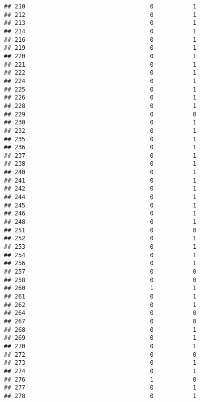 \documentclass[
]{article}
\begin{document}
\begin{verbatim}
## 210                                   0           1
## 212                                   0           1
## 213                                   0           1
## 214                                   0           1
## 216                                   0           1
## 219                                   0           1
## 220                                   0           1
## 221                                   0           1
## 222                                   0           1
## 224                                   0           1
## 225                                   0           1
## 226                                   0           1
## 228                                   0           1
## 229                                   0           0
## 230                                   0           1
## 232                                   0           1
## 235                                   0           1
## 236                                   0           1
## 237                                   0           1
## 238                                   0           1
## 240                                   0           1
## 241                                   0           1
## 242                                   0           1
## 244                                   0           1
## 245                                   0           1
## 246                                   0           1
## 248                                   0           1
## 251                                   0           0
## 252                                   0           1
## 253                                   0           1
## 254                                   0           1
## 256                                   0           1
## 257                                   0           0
## 258                                   0           0
## 260                                   1           1
## 261                                   0           1
## 262                                   0           1
## 264                                   0           0
## 267                                   0           0
## 268                                   0           1
## 269                                   0           1
## 270                                   0           1
## 272                                   0           0
## 273                                   0           1
## 274                                   0           1
## 276                                   1           0
## 277                                   0           1
## 278                                   0           1

\end{verbatim}
\end{document}
